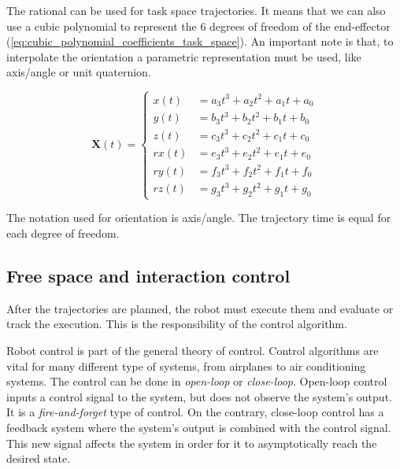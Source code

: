 The rational can be used for task space trajectories. It means that we can also use a cubic polynomial to represent the 6 degrees of freedom of the end-effector (\ref{eq:cubic_polynomial_coefficients_task_space}). An important note is that, to interpolate the orientation a parametric representation must be used, like axis/angle or unit quaternion.

\begin{equation}
    \label{eq:cubic_polynomial_coefficients_task_space}
    \boldsymbol{X}(t) = \left\{
    \begin{aligned}
        x(t) &= a_3 t^3 + a_2 t^2 + a_1 t + a_0\\
        y(t) &= b_3 t^3 + b_2 t^2 + b_1 t + b_0\\
        z(t) &= c_3 t^3 + c_2 t^2 + c_1 t + c_0\\
        rx(t) &= e_3 t^3 + e_2 t^2 + e_1 t + e_0\\
        ry(t) &= f_3 t^3 + f_2 t^2 + f_1 t + f_0\\
        rz(t) &= g_3 t^3 + g_2 t^2 + g_1 t + g_0
    \end{aligned}
    \right.
\end{equation}

The notation used for orientation is axis/angle. The trajectory time is equal for each degree of freedom.



\subsection{Free space and interaction control}
\label{subsec:free_space_interaction_control}

After the trajectories are planned, the robot must execute them and evaluate or track the execution. This is the responsibility of the control algorithm.

Robot control is part of the general theory of control. Control algorithms are vital for many different type of systems, from airplanes to air conditioning systems. The control can be done in \emph{open-loop} or \emph{close-loop}. Open-loop control inputs a control signal to the system, but does not observe the system's output. It is a \emph{fire-and-forget} type of control. On the contrary, close-loop control has a feedback system where the system's output is combined with the control signal. This new signal affects the system in order for it to asymptotically reach the desired state.\\  

